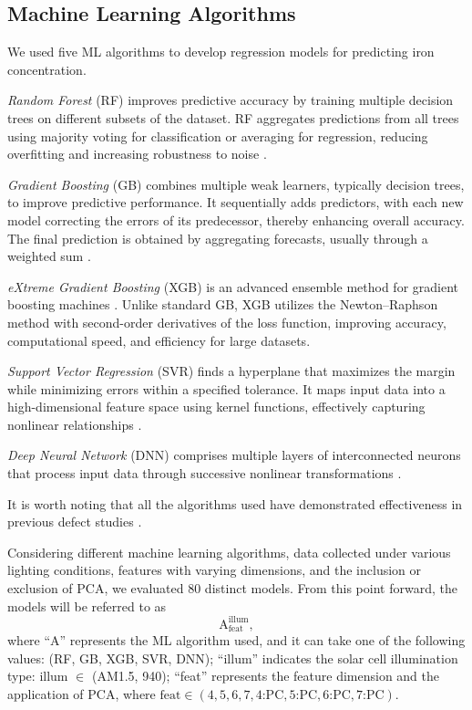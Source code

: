 \documentclass[a4paper,fleqn]{cas-sc}
\begin{document}
\subsection{Machine Learning Algorithms}

We used five ML algorithms to develop regression models for predicting iron concentration.

\emph{Random Forest} (RF) improves predictive accuracy by training multiple decision trees on different subsets of the dataset.
RF aggregates predictions from all trees using majority voting for classification or averaging for regression,
reducing overfitting and increasing robustness to noise \cite{Breiman2001}.

\emph{Gradient Boosting} (GB) combines multiple weak learners, typically decision trees, to improve predictive performance.
It sequentially adds predictors, with each new model correcting the errors of its predecessor, thereby enhancing overall accuracy.
The final prediction is obtained by aggregating forecasts, usually through a weighted sum \cite{Natekin2013}.

\emph{eXtreme Gradient Boosting} (XGB) is an advanced ensemble method for gradient boosting machines \cite{Akinpelu2024}.
Unlike standard GB, XGB utilizes the Newton–Raphson method with second-order derivatives of the loss function,
improving accuracy, computational speed, and efficiency for large datasets.

\emph{Support Vector Regression }(SVR) finds a hyperplane that maximizes the margin while minimizing errors within a specified tolerance.
It maps input data into a high-dimensional feature space using kernel functions, effectively capturing nonlinear relationships \cite{Cao2020}.

\emph{Deep Neural Network} (DNN) comprises multiple layers of interconnected neurons that process input data
through successive nonlinear transformations \cite{Liu2023}.

It is worth noting that all the algorithms used have demonstrated effectiveness in previous
defect studies \cite{Buratti2020a, Buratti2022, Olikh2022PPV, Buratti2024}.

Considering different machine learning algorithms, data collected under various lighting conditions,
features with varying dimensions, and the inclusion or exclusion of PCA, we evaluated 80 distinct models.
From this point forward, the models will be referred to as
\begin{equation*}
    \mathrm{A}^\mathrm{illum}_\mathrm{feat},
\end{equation*}
where ``A'' represents the ML algorithm used,
and it can take one of the following values: (RF, GB, XGB, SVR, DNN);
``illum'' indicates the solar cell illumination type: illum $\in$ (AM1.5, 940);
``feat'' represents the feature dimension and the application of PCA,
where $\mathrm{feat} \in (4, 5, 6, 7, 4\text{:PC}, 5\text{:PC}, 6\text{:PC}, 7\text{:PC})$.
\end{document}
